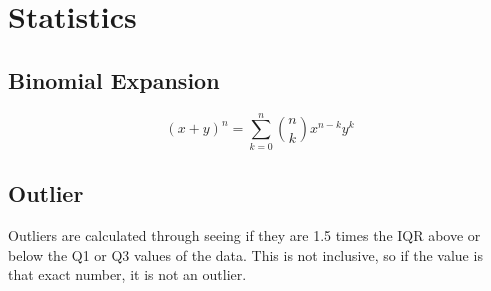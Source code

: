 \documentclass[../main.tex]{subfiles}
\begin{document}
\section{Statistics}

\subsection{Binomial Expansion}

\[ (x + y)^n = \sum_{k=0}^n \binom{n}{k} x^{n-k}y^k \]


\subsection{Outlier}

Outliers are calculated through seeing if they are 1.5 times the IQR above or below the Q1 or Q3 values of the data. This is not inclusive, so if the value is that exact number, it is not an outlier.
\end{document}
